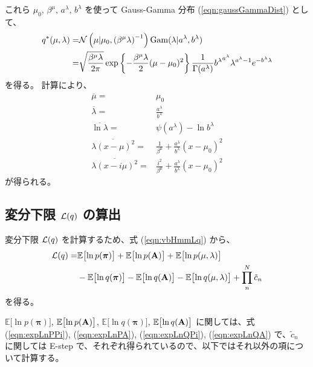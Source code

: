 これら $\mu_{0}$, $\beta^\mu$, $a^\lambda$, $b^\lambda$ を使って Gauss-Gamma 分布 (\ref{eqn:gaussGammaDist}) として、
\begin{align}
  q^*( \mu, \lambda )  =&  \mathcal{N}\left( \mu | \mu_{0}, \left(\beta^\mu {\lambda} \right)^{-1} \right) {\rm Gam}(\lambda | a^\lambda, b^\lambda) \\
  =&  \sqrt{ \frac{ \beta^\mu \lambda }{ 2 \pi }} \exp\left\{ - \frac{\beta^\mu \lambda}{2} (\mu - \mu_{0})^2 \right\} \frac{ 1 }{ \Gamma(a^\lambda) } {b^\lambda}^{a^\lambda} {\lambda}^{a^\lambda - 1} e^{-b^\lambda \lambda}
\end{align}
を得る。
計算により、
\begin{align}
  \overline{\mu}  =&  \mu_{0}  \\
  \overline{\lambda}  =&  \frac{a^\lambda}{b^\lambda}  \\
  \overline{\ln \lambda}  =&  \psi(a^\lambda) - \ln b^\lambda  \\
  \overline{\lambda (x - {\mu})^2}  =&  \frac{1}{\beta^\mu} + \frac{a^\lambda}{b^\lambda} (x - \mu_{0})^2  \\  
  \overline{\lambda (x - i {\mu})^2}  =&  \frac{i^2}{\beta^\mu} + \frac{a^\lambda}{b^\lambda} (x - \mu_{0})^2  
\end{align}
が得られる。


\subsection{ 変分下限 ${\cal L}(q)$ の算出 }

変分下限 ${\cal L}(q)$ を計算するため、式 (\ref{eqn:vbHmmLq}) から、
\begin{align}
  {\cal L}(q)  = &  \mathbb{E}\bigl[\ln p({\boldsymbol \pi}) \bigr] + \mathbb{E}\bigl[\ln p({\bf A}) \bigr] + \mathbb{E}\bigl[\ln p(\mu, \lambda) \bigr]   \notag  \\
  &  - \mathbb{E}\bigl[\ln q({\boldsymbol \pi}) \bigr] - \mathbb{E}\bigl[\ln q({\bf A}) \bigr] - \mathbb{E}\bigl[\ln q( \mu, \lambda) \bigr] + \prod_n^N \tilde{c}_n  
\end{align}
を得る。

$\mathbb{E}\bigl[\ln p({\boldsymbol \pi})\bigr]$, $\mathbb{E}\bigl[\ln p({\bf A})\bigr]$, $\mathbb{E}\bigl[\ln q({\boldsymbol \pi})\bigr]$, $\mathbb{E}\bigl[\ln q({\bf A}) \bigr]$ に関しては、式 (\ref{eqn:expLnPPi}), (\ref{eqn:expLnPA}), (\ref{eqn:expLnQPi}), (\ref{eqn:expLnQA}) で、$\tilde{c}_n$ に関しては E-step で、それぞれ得られているので、以下ではそれ以外の項について計算する。

